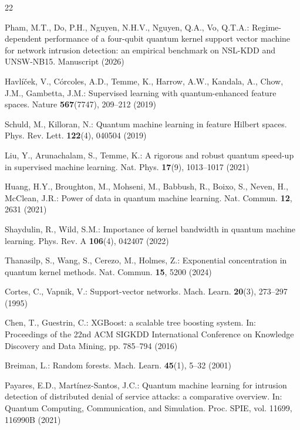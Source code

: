 \documentclass[runningheads]{llncs}
\begin{document}
\begin{thebibliography}{22}


Pham, M.T., Do, P.H., Nguyen, N.H.V., Nguyen, Q.A., Vo, Q.T.A.: Regime-dependent
  performance of a four-qubit quantum kernel support vector machine for network
  intrusion detection: an empirical benchmark on NSL-KDD and UNSW-NB15.
  Manuscript (2026)

Havl\'i\v{c}ek, V., C\'orcoles, A.D., Temme, K., Harrow, A.W., Kandala, A.,
  Chow, J.M., Gambetta, J.M.: Supervised learning with quantum-enhanced
  feature spaces. Nature \textbf{567}(7747), 209--212 (2019)

Schuld, M., Killoran, N.: Quantum machine learning in feature Hilbert spaces.
  Phys. Rev. Lett. \textbf{122}(4), 040504 (2019)

Liu, Y., Arunachalam, S., Temme, K.: A rigorous and robust quantum speed-up
  in supervised machine learning. Nat. Phys. \textbf{17}(9), 1013--1017
  (2021)

Huang, H.Y., Broughton, M., Mohseni, M., Babbush, R., Boixo, S., Neven, H.,
  McClean, J.R.: Power of data in quantum machine learning. Nat. Commun.
  \textbf{12}, 2631 (2021)

Shaydulin, R., Wild, S.M.: Importance of kernel bandwidth in quantum machine
  learning. Phys. Rev. A \textbf{106}(4), 042407 (2022)

Thanasilp, S., Wang, S., Cerezo, M., Holmes, Z.: Exponential concentration in
  quantum kernel methods. Nat. Commun. \textbf{15}, 5200 (2024)

Cortes, C., Vapnik, V.: Support-vector networks. Mach. Learn.
  \textbf{20}(3), 273--297 (1995)

Chen, T., Guestrin, C.: XGBoost: a scalable tree boosting system. In:
  Proceedings of the 22nd ACM SIGKDD International Conference on Knowledge
  Discovery and Data Mining, pp. 785--794 (2016)

Breiman, L.: Random forests. Mach. Learn. \textbf{45}(1), 5--32 (2001)

Payares, E.D., Mart\'inez-Santos, J.C.: Quantum machine learning for
  intrusion detection of distributed denial of service attacks: a
  comparative overview. In: Quantum Computing, Communication, and Simulation.
  Proc. SPIE, vol. 11699, 116990B (2021)


\end{thebibliography}
\end{document}
